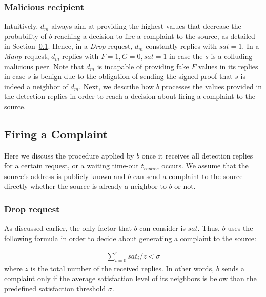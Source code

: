 \subsubsection*{Malicious recipient}

Intuitively, $d_m$ always aim at providing the highest values that decrease the probability of $b$ reaching a decision to fire a complaint to the source, as detailed in Section~\ref{Firing_a_Complain}.
Hence, in a \textit{Drop} request, $d_m$ constantly replies with $sat=1$.
In a \textit{Manp} request, $d_m$ replies with $F=1, G=0, sat=1$ in case the $s$ is a colluding malicious peer.
Note that $d_m$ is incapable of providing fake $F$ values in its replies in case $s$ is benign due to the obligation of sending the signed proof that $s$ is indeed a neighbor of $d_m$. 
Next, we describe how $b$ processes the values provided in the detection replies in order to reach a decision about firing a complaint to the source.

\subsection{Firing a Complaint}
\label{Firing_a_Complain}
Here we discuss the procedure applied by $b$ once it receives all detection replies for a certain request, or a waiting time-out $t_{replies}$ occurs.
We assume that the source's address is publicly known and $b$ can send a complaint to the source directly whether the source is already a neighbor to $b$ or not.
\subsubsection*{Drop request}
As discussed earlier, the only factor that $b$ can consider is $sat$.
Thus, $b$ uses the following formula in order to decide about generating a complaint to the source:

\begin{align}
\label{eq:drop_satis_equation}
\sum_{i=0}^{z} sat_i/z < \sigma
\end{align}
where $z$ is the total number of the received replies. 
In other words, $b$ sends a complaint only if the average satisfaction level of its neighbors is below than the predefined satisfaction threshold $\sigma$.

